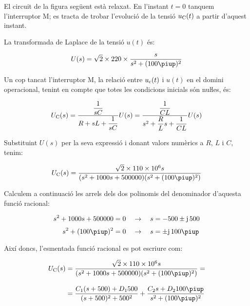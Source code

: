 \begin{exemple}
\label{ex:laplace}
    El circuit de la figura següent està relaxat. En l'instant $t=0$
    tanquem l'interruptor M; es tracta de trobar l'evolució de la tensió
    $u_\mathrm{C}(t)$ a partir d'aquest instant.

    \begin{center}
        
    \end{center}

    La transformada de Laplace de la tensió $u(t)$ és:

    \[
        U(s) = \sqrt{2}\times 220\times \frac{s}{s^2 + (100\piup)^2}
    \]

    Un cop tancat l'interruptor M, la relació entre $u_\mathrm{c}(t)$ i
    $u(t)$ en el domini operacional, tenint en compte que totes les
    condicions inicials són nuŀles, és:

    \[
        U_\mathrm{C}(s) = \frac{\dfrac{1}{sC}}{R+ sL +\dfrac{1}{sC}} U(s)=
        \frac{\dfrac{1}{CL}}{s^2 + \dfrac{R}{L}s +\dfrac{1}{CL}} U(s)
    \]

    Substituint $U(s)$ per la seva expressió i donant valors numèrics a
    $R$, $L$ i $C$, tenim:

    \[
        U\ped{C}(s) = \frac{\sqrt{2}\times 110\times 10^6 s}{(s^2 + 1000 s + 500000)(s^2 + (100\piup)^2)}
    \]

    Calculem a continuació les arrels dels dos polinomis  del
    denominador d'aquesta funció racional:

    \begin{align*}
        s^2 + 1000 s + 500000 &= 0 \quad\rightarrow\quad s = -500
        \pm\ju\,500 \\[0.5ex]
        s^2 + (100\piup)^2 &= 0 \quad\rightarrow\quad s = \pm\ju\,100\piup
    \end{align*}

    Així doncs, l'esmentada funció racional es pot escriure com:

    \[\begin{split}
    U\ped{C}(s) &= \frac{\sqrt{2}\times 110\times 10^6 s}{(s^2 + 1000 s +
    500000)(s^2 + (100\piup)^2)}  = \\[2ex] &= \frac{C_1 (s+500) + D_1
    500}{(s+500)^2+500^2} + \frac{C_2 s + D_2 100 \piup}{s^2 +(100\piup)^2}
    \end{split}\]


\end{exemple}
